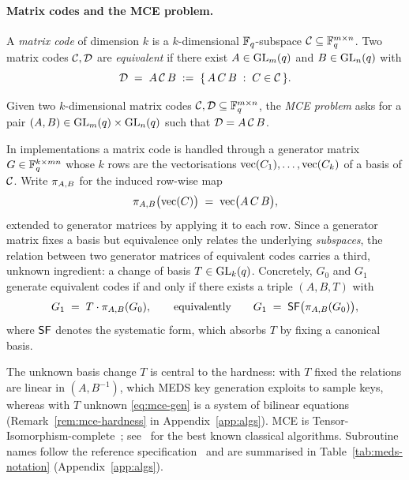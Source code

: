 \paragraph{Matrix codes and the MCE problem.}
A \emph{matrix code} of dimension $k$ is a $k$-dimensional $\mathbb{F}_q$-subspace
$\mathcal{C} \subseteq \mathbb{F}_q^{m \times n}$. Two matrix codes $\mathcal{C}, \mathcal{D}$ are
\emph{equivalent} if there exist $A \in \mathrm{GL}_m(q)$ and $B \in \mathrm{GL}_n(q)$ with
\[
  \mathcal{D} \;=\; A\,\mathcal{C}\,B \;:=\; \{\, A\,C\,B \;:\; C \in \mathcal{C} \,\}.
\]

\begin{definition}
\label{def:mce}
Given two $k$-dimensional matrix codes $\mathcal{C}, \mathcal{D} \subseteq \mathbb{F}_q^{m\times n}$,
the \emph{MCE problem} asks for a pair $(A,B) \in \mathrm{GL}_m(q) \times \mathrm{GL}_n(q)$
such that $\mathcal{D} = A\,\mathcal{C}\,B$.
\end{definition}

In implementations a matrix code is handled through a generator matrix
$G \in \mathbb{F}_q^{k \times mn}$ whose $k$ rows are the vectorisations
$\mathrm{vec}(C_1),\ldots,\mathrm{vec}(C_k)$ of a basis of $\mathcal{C}$. Write $\pi_{A,B}$ for
the induced row-wise map
\[
  \pi_{A,B}\bigl(\mathrm{vec}(C)\bigr) \;=\; \mathrm{vec}\bigl(A\,C\,B\bigr),
\]
extended to generator matrices by applying it to each row. Since a generator
matrix fixes a basis but equivalence only relates the underlying
\emph{subspaces}, the relation between two generator matrices of equivalent
codes carries a third, unknown ingredient: a change of basis
$T \in \mathrm{GL}_k(q)$. Concretely, $G_0$ and $G_1$ generate equivalent codes if and
only if there exists a triple $(A,B,T)$ with
\begin{equation}
  \label{eq:mce-gen}
  G_1 \;=\; T \cdot \pi_{A,B}(G_0),
  \qquad\text{equivalently}\qquad
  G_1 \;=\; \mathsf{SF}\bigl(\pi_{A,B}(G_0)\bigr),
\end{equation}
where $\mathsf{SF}$ denotes the systematic form, which absorbs $T$ by fixing a
canonical basis.

The unknown basis change $T$ is central to the hardness: with $T$ fixed the
relations are linear in $(A,B^{-1})$, which MEDS key generation exploits to
sample keys, whereas with $T$ unknown \eqref{eq:mce-gen} is a system of
bilinear equations (Remark~\ref{rem:mce-hardness} in
Appendix~\ref{app:algs}). MCE is Tensor-Isomorphism-complete~\cite{GrochowQiao23};
see~\cite{ReijndersST23,NarayananQT24} for the best known classical
algorithms. Subroutine names follow the reference
specification~\cite{ChouNPRRST23,MEDS_PQC} and are summarised in
Table~\ref{tab:meds-notation} (Appendix~\ref{app:algs}).

